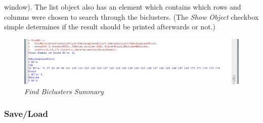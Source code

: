 \documentclass[a4paper]{article}\usepackage[]{graphicx}\usepackage[]{color}
\begin{document}
window). The list object also has an element which contains which rows and
columns were chosen to search through the biclusters.
(The {\it Show Object} checkbox simple determines if the result should be
printed afterwards or not.)
\begin{figure}[H]
\centering
\includegraphics[scale=0.4]{figures/findwindow_example1.png}
\caption{{\it Find Biclusters Summary}\label{findwindow_example1}}
\end{figure}





\subsubsection{Save/Load}
\end{document}
